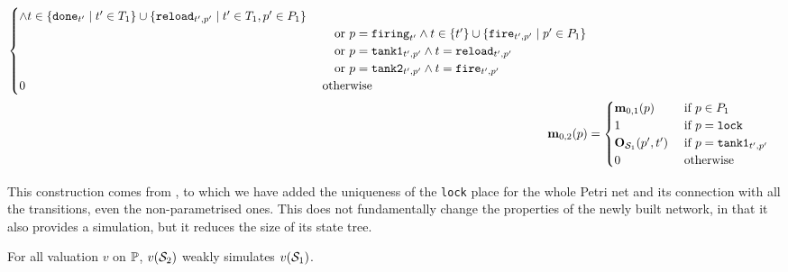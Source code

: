 \begin{align*}
\begin{cases}
          \wedge t \in \setComp{\mathtt{done}_{t'}}{t' \in \transitions_1} \cup \setComp{\mathtt{reload}_{t',p'}}{t' \in \transitions_1, p' \in \places_1} \\
        &\quad\text{ or } p = \mathtt{firing}_{t'}
          \wedge t \in \{t'\} \cup \setComp{\mathtt{fire}_{t',p'}}{p' \in \places_1} \\
        &\quad\text{ or } p = \mathtt{tank1}_{t',p'} \wedge t = \mathtt{reload}_{t',p'} \\
        &\quad\text{ or } p = \mathtt{tank2}_{t',p'} \wedge t = \mathtt{fire}_{t',p'} \\
      0 &\text{ otherwise }
    \end{cases}\\
  \mar_{0,2}(p) &= \begin{cases}
      \mar_{0,1}(p)             &\text{ if } p \in \places_1 \\
      1                         &\text{ if } p = \mathtt{lock} \\
      \outm[\namePPN[1]][p',t'] &\text{ if } p = \mathtt{tank1}_{t',p'} \\
      0                         &\text{ otherwise }
    \end{cases}
\end{align*}

This construction comes from \cite{David17}, to which we have added the uniqueness of the \texttt{lock} place for the whole Petri net and its connection with all the transitions, even the non-parametrised ones.
This does not fundamentally change the properties of the newly built network, in that it also provides a simulation, but it reduces the size of its state tree.

\begin{lemm}
  \label{theo:simulation-p-ppn-postt-ppn}
  For all valuation $v$ on $\parameters$, $v(\namePPN[2])$ weakly simulates $v(\namePPN[1])$.
\end{lemm}


